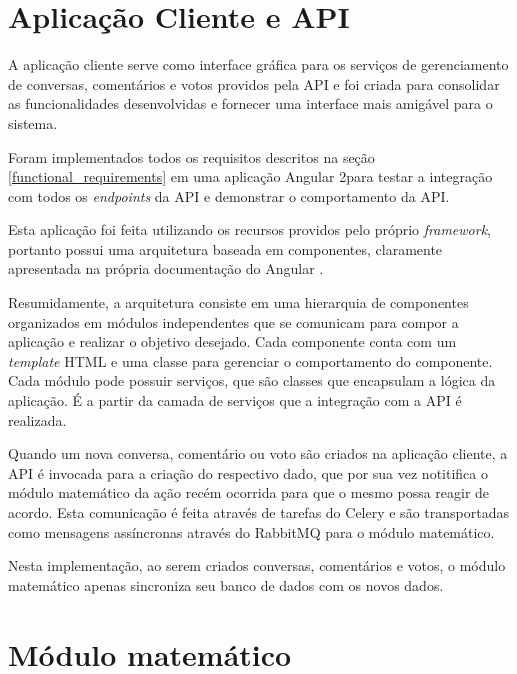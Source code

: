   \section{Aplicação Cliente e API}
    
    A aplicação cliente serve como interface gráfica para os serviços de 
    gerenciamento de conversas, comentários e votos providos pela API e foi
    criada para consolidar as funcionalidades desenvolvidas e fornecer uma interface mais
    amigável para o sistema.
    
    Foram implementados todos os requisitos descritos na seção \ref{functional_requirements}
    em uma aplicação Angular 2\footnotemark para
    testar a integração com todos os \textit{endpoints} da API e demonstrar o comportamento da API.
    
    Esta aplicação foi feita utilizando os recursos providos pelo próprio \textit{framework}, portanto
    possui uma arquitetura baseada em componentes, claramente apresentada na própria documentação do Angular \footnotemark.
    
    Resumidamente, a arquitetura consiste em uma hierarquia de componentes organizados
    em módulos independentes que se comunicam para compor a aplicação e realizar o objetivo desejado.
    Cada componente conta com um \textit{template} HTML e uma classe para gerenciar o comportamento do componente.
    Cada módulo pode possuir serviços, que são classes que encapsulam a lógica da aplicação.
    É a partir da camada de serviços que a integração com a API é realizada.
    
    Quando um nova conversa, comentário ou voto são criados na aplicação cliente,
    a API é invocada para a criação do respectivo dado, que por sua vez
    notitifica o módulo matemático da ação recém ocorrida para que o mesmo possa reagir de acordo.
    Esta comunicação é feita através de tarefas do Celery e são transportadas como mensagens assíncronas
    através do RabbitMQ para o módulo matemático.
    
    Nesta implementação, ao serem criados conversas, comentários e votos, o módulo matemático apenas
    sincroniza seu banco de dados com os novos dados.
  
  \section{Módulo matemático}
  
